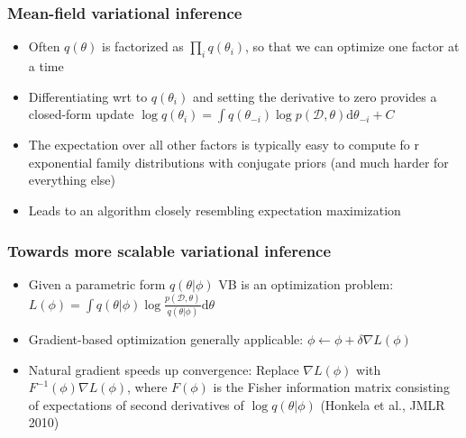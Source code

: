 \documentclass{beamer}
\newcommand{\dataset}{\mathcal{D}}
\newcommand{\parameters}{\theta}
\newcommand{\vparameters}{\phi}
\newcommand{\diff}{\mathrm{d}}
\begin{document}
\begin{frame}
  \frametitle{Mean-field variational inference}

  \begin{itemize}
    \item Often $q(\parameters)$ is factorized as $\prod_i q(\parameters_i)$, so that
      we can optimize one factor at a time
    \item Differentiating wrt to $q(\parameters_i)$ and setting the derivative to zero provides a closed-form
      update $\log q(\parameters_i) = \int q(\parameters_{-i}) \log p(\dataset, \parameters) \diff \parameters_{-i} + C$
    \item The expectation over all other factors is typically easy to compute fo
r exponential
      family distributions with conjugate priors (and much harder for everything else)
    \item Leads to an algorithm closely resembling expectation maximization
  \end{itemize}
\end{frame}


\begin{frame}
  \frametitle{Towards more scalable variational inference}

  \begin{itemize}
  \item Given a parametric form $q(\parameters|\vparameters)$ VB is an optimization problem:
  $L(\vparameters) = \int q(\parameters|\vparameters) \log \frac{p(\dataset,\parameters)}{q(\parameters|\vparameters)} \diff \parameters$
  \item Gradient-based optimization generally applicable: $\vparameters \leftarrow \vparameters + \delta
    \nabla L(\vparameters)$
  \item Natural gradient speeds up convergence: Replace $\nabla L(\vparameters)$ with $F^{-1}(\vparameters)
\nabla L(\vparameters)$, where $F(\vparameters)$ is the Fisher information matrix
  consisting of expectations of second derivatives of $\log q(\parameters | \vparameters)$
 (Honkela et al., JMLR 2010)
  \end{itemize}
\end{frame}
\end{document}
